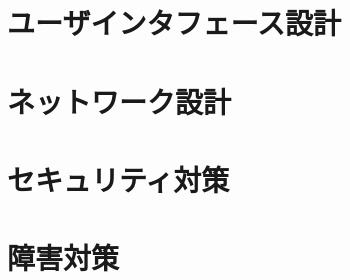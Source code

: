 \documentclass[a4j,titlepage]{jarticle}
\begin{document}
\section{ユーザインタフェース設計}

\section{ネットワーク設計}

\section{セキュリティ対策}

\section{障害対策}
\end{document}
